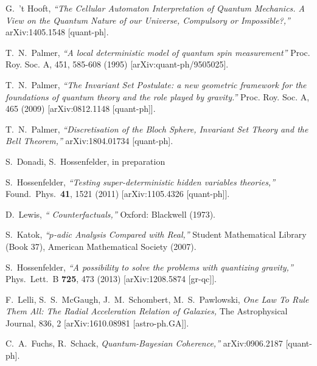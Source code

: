 \documentclass[12pt]{article}
\begin{document}
\begin{thebibliography}{99}
  G.~'t Hooft,
  {\sl ``The Cellular Automaton Interpretation of Quantum Mechanics. A View on the Quantum Nature of our Universe, Compulsory or Impossible?,''}
  arXiv:1405.1548 [quant-ph].
  
  T.~N.~Palmer,
  {\sl ``A local deterministic model of quantum spin measurement''}
  Proc. Roy. Soc. A, 451, 585-608 (1995) 	[arXiv:quant-ph/9505025]. 
 

  T.~N.~Palmer,
  {\sl ``The Invariant Set Postulate: a new geometric framework for the foundations of quantum theory and the role played by gravity.''}
  Proc. Roy. Soc. A, 465 (2009) 	[arXiv:0812.1148 [quant-ph]]. 


  T.~N.~Palmer,
  {\sl ``Discretisation of the Bloch Sphere, Invariant Set Theory and the Bell Theorem,''}
  arXiv:1804.01734 [quant-ph].
  
   S.~Donadi, S.~Hossenfelder, in preparation
  
  S.~Hossenfelder,
  {\sl ``Testing super-deterministic hidden variables theories,''}
  Found.\ Phys.\  {\bf 41}, 1521 (2011)
  [arXiv:1105.4326 [quant-ph]].
  
  D.~Lewis, {\sl `` Counterfactuals,''} Oxford: Blackwell (1973). 
  
   S.~Katok, {\sl ``$p$-adic Analysis Compared with Real,''} Student Mathematical Library (Book 37), American Mathematical Society (2007).

  S.~Hossenfelder,
  {\sl ``A possibility to solve the problems with quantizing gravity,''}
  Phys.\ Lett.\ B {\bf 725}, 473 (2013)
  [arXiv:1208.5874 [gr-qc]].

 F.~Lelli, S.~S.~McGaugh, J.~M.~Schombert, M.~S.~Pawlowski, {\sl One Law To Rule Them All: The Radial Acceleration Relation of Galaxies,} The Astrophysical Journal, 836, 2 [arXiv:1610.08981 [astro-ph.GA]].


  

 C.~A.~Fuchs,  R.~Schack, {\sl Quantum-Bayesian Coherence,''} arXiv:0906.2187 [quant-ph].
  
\end{thebibliography}
\end{document}
